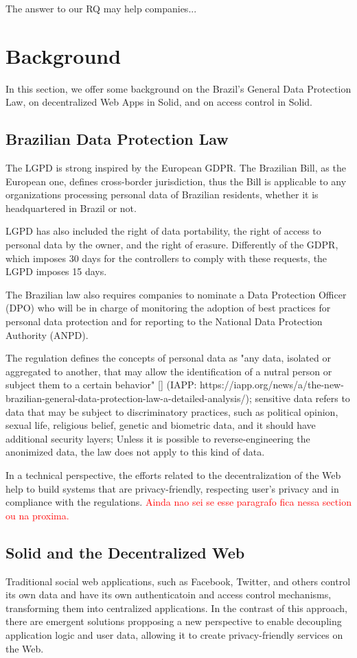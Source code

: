 \documentclass[sigconf]{acmart}
\begin{document}
The answer to our RQ may help companies...


\section{Background}
In this section, we offer some background on the Brazil's General Data Protection Law, on decentralized Web Apps in Solid, and on access control in Solid.

\subsection{Brazilian Data Protection Law}
The LGPD is strong inspired by the European GDPR. The Brazilian Bill, as the European one, defines cross-border jurisdiction, thus the Bill is applicable to any organizations processing personal data of Brazilian residents, whether it is headquartered in Brazil or not.

LGPD has also included the right of data portability, the right of access to personal data by the owner, and the right of erasure. Differently of the GDPR, which imposes 30 days for the controllers to comply with these requests, the LGPD imposes 15 days.

The Brazilian law also requires companies to nominate a Data Protection Officer (DPO) who will be in charge of monitoring the adoption of best practices for personal data protection and for reporting to the National Data Protection Authority (ANPD).

The regulation defines the concepts of personal data as "any data, isolated or aggregated to another, that may allow the identification of a nutral person or subject them to a certain behavior" [] (IAPP: https://iapp.org/news/a/the-new-brazilian-general-data-protection-law-a-detailed-analysis/); sensitive data refers to data that may be subject to discriminatory practices, such as political opinion, sexual life, religious belief, genetic and biometric data, and it should have additional security layers; Unless it is possible to reverse-engineering the anonimized data, the law does not apply to this kind of data.

In a technical perspective, the efforts related to the decentralization of the Web help to build systems that are privacy-friendly, respecting user's privacy and in compliance with the regulations.
\textcolor{red}{Ainda nao sei se esse paragrafo fica nessa section ou na proxima.}

\subsection{Solid and the Decentralized Web}
Traditional social web applications, such as Facebook, Twitter, and others control its own data and have its own authenticatoin and access control mechanisms, transforming them into centralized applications. In the contrast of this approach, there are emergent solutions propposing a new perspective to enable decoupling application logic and user data, allowing it to create privacy-friendly services on the Web.
\end{document}
